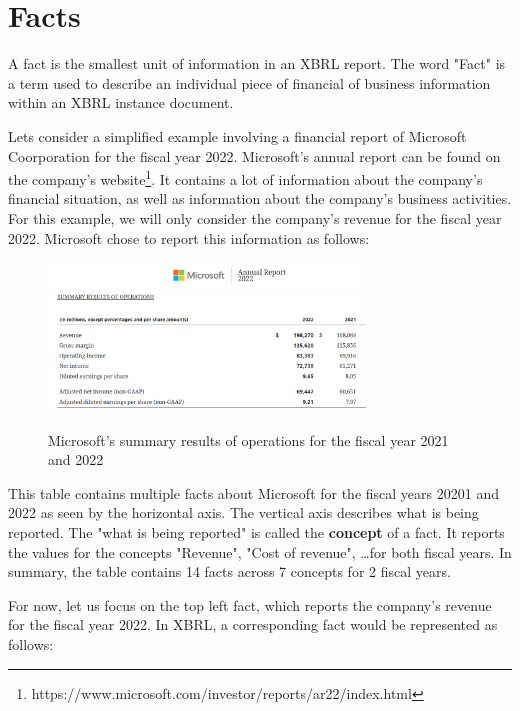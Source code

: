 \section{Facts}
\label{sec:facts}

A fact is the smallest unit of information in an XBRL report. 
The word "Fact" is a term used to describe an individual piece of financial of business information within an XBRL instance document. 

Lets consider a simplified example involving a financial report of Microsoft Coorporation for the fiscal year 2022.
Microsoft's annual report can be found on the company's website\footnote[0]{https://www.microsoft.com/investor/reports/ar22/index.html}.
It contains a lot of information about the company's financial situation, as well as information about the company's business activities.
For this example, we will only consider the company's revenue for the fiscal year 2022.
Microsoft chose to report this information as follows:

\begin{figure}[H]
    \centering
    \includegraphics[width=0.75\textwidth]{images/microsoft_annual_report_2022.png}
    \caption{Microsoft's summary results of operations for the fiscal year 2021 and 2022}
    \label{fig:microsoft_annual_report_2022}
    \cite{microsoft2022ar}
\end{figure}

This table contains multiple facts about Microsoft for the fiscal years 20201 and 2022 as seen by the horizontal axis.
The vertical axis describes what is being reported. The "what is being reported" is called the \textbf{concept} of a fact.
It reports the values for the concepts "Revenue", "Cost of revenue", \dots for both fiscal years.
In summary, the table contains 14 facts across 7 concepts for 2 fiscal years.

For now, let us focus on the top left fact, which reports the company's revenue for the fiscal year 2022.
In XBRL, a corresponding fact would be represented as follows:

